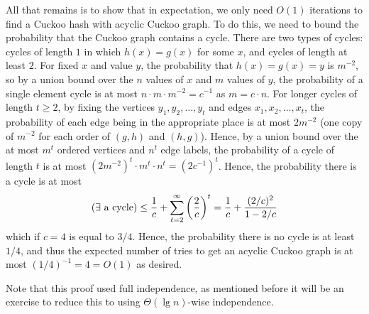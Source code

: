 \documentclass[11pt]{article}
\let\Pr\relax
\DeclareMathOperator*{\Pr}{\mathbb{P}}
\begin{document}
All that remains is to show that in expectation, we only need $O(1)$ iterations
to find a Cuckoo hash with acyclic Cuckoo graph. To do this, we need to bound
the probability that the Cuckoo graph contains a cycle. There are two types of
cycles: cycles of length $1$ in which $h(x) = g(x)$ for some $x$, and cycles of
length at least $2$. For fixed $x$ and value $y$, the probability that $h(x) =
g(x) = y$ is $m^{-2}$, so by a union bound over the $n$ values of $x$ and $m$
values of $y$, the probability of a single element cycle is at most $n\cdot m
\cdot m^{-2} = c^{-1}$ as $m = c\cdot n$. For longer cycles of length $t\geq 2$,
by fixing the vertices $y_1,y_2,\dotsc, y_t$ and edges $x_1, x_2, \dotsc, x_t$,
the probability of each edge being in the appropriate place is at most $2m^{-2}$
(one copy of $m^{-2}$ for each order of $(g, h)$ and $(h, g)$). Hence, by a
union bound over the at most $m^t$ ordered vertices and $n^t$ edge labels, the
probability of a cycle of length $t$ is at most $(2m^{-2})^t\cdot m^t\cdot n^t =
(2c^{-1})^t$. Hence, the probability there is a cycle is at most
\[
  \Pr(\exists\text{ a cycle}) \leq \frac{1}{c} +
  \sum_{t=2}^{\infty} \left(\frac{2}{c}\right)^t
   = \frac{1}{c} + \frac{(2/c)^2}{1 - 2/c}
\]
which if $c = 4$ is equal to $3/4$. Hence, the probability there is no cycle is
at least $1/4$, and thus the expected number of tries to get an acyclic Cuckoo
graph is at most $(1/4)^{-1} = 4 = O(1)$ as desired.

Note that this proof used full independence, as mentioned before it will be an
exercise to reduce this to using $\Theta(\lg n)$-wise independence.


\end{document}

